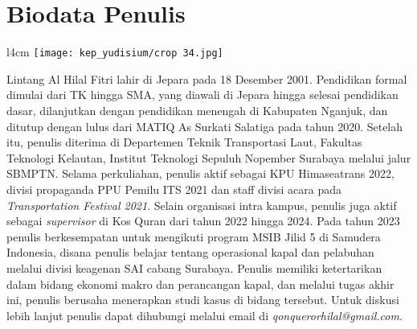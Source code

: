 \chapter{Biodata Penulis}

\begin{wrapfigure}{l}{4cm}
    \vspace{-20pt}
    \texttt{[image: kep\_yudisium/crop 34.jpg]}
    \vspace{-20pt}
\end{wrapfigure}

Lintang Al Hilal Fitri lahir di Jepara pada 18 Desember 2001. Pendidikan formal dimulai dari TK hingga SMA, yang diawali di Jepara hingga selesai pendidikan dasar, dilanjutkan dengan pendidikan menengah di Kabupaten Nganjuk, dan ditutup dengan lulus dari MATIQ As Surkati Salatiga pada tahun 2020. Setelah itu, penulis diterima di Departemen Teknik Transportasi Laut, Fakultas Teknologi Kelautan, Institut Teknologi Sepuluh Nopember Surabaya melalui jalur SBMPTN. Selama perkuliahan, penulis aktif sebagai KPU Himaseatrans 2022, divisi propaganda PPU Pemilu ITS 2021 dan staff divisi acara pada \emph{Transportation Festival 2021}. Selain organisasi intra kampus, penulis juga aktif sebagai \emph{supervisor} di Kos Quran dari tahun 2022 hingga 2024. Pada tahun 2023 penulis berkesempatan untuk mengikuti program MSIB Jilid 5 di Samudera Indonesia, disana penulis belajar tentang operasional kapal dan pelabuhan melalui divisi keagenan SAI cabang Surabaya. Penulis memiliki ketertarikan dalam bidang ekonomi makro dan perancangan kapal, dan melalui tugas akhir ini, penulis berusaha menerapkan studi kasus di bidang tersebut. Untuk diskusi lebih lanjut penulis dapat dihubungi melalui email di \emph{qonquerorhilal@gmail.com}.
